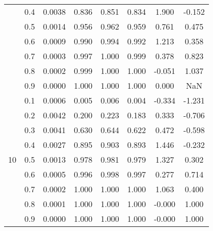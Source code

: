 \documentclass[11pt,a4paper]{report}
\begin{document}
\begin{longtable}{ | c | c || c | c | c | c | c | c | }
 & 0.4 & 0.0038 & 0.836 & 0.851 & 0.834 & 1.900 & -0.152 \\
 & 0.5 & 0.0014 & 0.956 & 0.962 & 0.959 & 0.761 & 0.475 \\
 & 0.6 & 0.0009 & 0.990 & 0.994 & 0.992 & 1.213 & 0.358 \\
 & 0.7 & 0.0003 & 0.997 & 1.000 & 0.999 & 0.378 & 0.823 \\
 & 0.8 & 0.0002 & 0.999 & 1.000 & 1.000 & -0.051 & 1.037 \\
 & 0.9 & 0.0000 & 1.000 & 1.000 & 1.000 & 0.000 & NaN \\
 \hline
\multirow{9}{*}{10} & 0.1 & 0.0006 & 0.005 & 0.006 & 0.004 & -0.334 & -1.231 \\
 & 0.2 & 0.0042 & 0.200 & 0.223 & 0.183 & 0.333 & -0.706 \\
 & 0.3 & 0.0041 & 0.630 & 0.644 & 0.622 & 0.472 & -0.598 \\
 & 0.4 & 0.0027 & 0.895 & 0.903 & 0.893 & 1.446 & -0.232 \\
 & 0.5 & 0.0013 & 0.978 & 0.981 & 0.979 & 1.327 & 0.302 \\
 & 0.6 & 0.0005 & 0.996 & 0.998 & 0.997 & 0.277 & 0.714 \\
 & 0.7 & 0.0002 & 1.000 & 1.000 & 1.000 & 1.063 & 0.400 \\
 & 0.8 & 0.0001 & 1.000 & 1.000 & 1.000 & -0.000 & 1.000 \\
 & 0.9 & 0.0000 & 1.000 & 1.000 & 1.000 & -0.000 & 1.000 \\
 \hline
\hline
\end{longtable}
\end{document}
